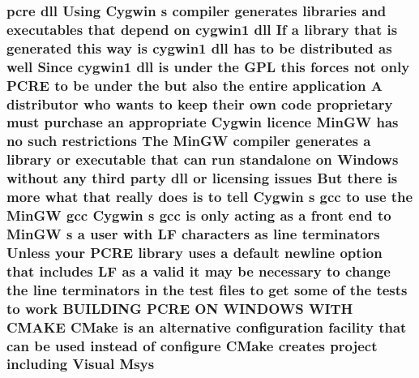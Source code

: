 \subsubsection[{\texorpdfstring{Msys}{Msys}}]{ {\bf pcre} dll Using Cygwin {\bf s} {\bf compiler} generates {\bf libraries} and executables that depend {\bf on} cygwin1 dll If {\bf a} {\bf library} that {\bf is} {\bf generated} {\bf this} {\bf way} {\bf is} cygwin1 dll has {\bf to} {\bf be} {\bf distributed} {\bf as} well Since cygwin1 dll {\bf is} under the {\bf G\+PL} {\bf this} forces {\bf not} only {\bf P\+C\+RE} {\bf to} {\bf be} under the but also the entire application {\bf A} distributor who wants {\bf to} keep their own {\bf code} proprietary must purchase an appropriate Cygwin {\bf licence} {\bf Min\+GW} has no such restrictions The {\bf Min\+GW} {\bf compiler} generates {\bf a} {\bf library} {\bf or} executable that {\bf can} {\bf run} standalone {\bf on} {\bf Windows} without {\bf any} third party dll {\bf or} licensing issues But there {\bf is} more {\bf what} that really does {\bf is} {\bf to} tell Cygwin {\bf s} {\bf gcc} {\bf to} use the {\bf Min\+GW} {\bf gcc} Cygwin {\bf s} {\bf gcc} {\bf is} only acting {\bf as} {\bf a} front {\bf end} {\bf to} {\bf Min\+GW} {\bf s} {\bf a} user {\bf with} {\bf LF} {\bf characters} {\bf as} {\bf line} terminators Unless your {\bf P\+C\+RE} {\bf library} uses {\bf a} {\bf default} {\bf newline} {\bf option} that includes {\bf LF} {\bf as} {\bf a} valid {\bf it} may {\bf be} necessary {\bf to} change the {\bf line} terminators {\bf in} the test {\bf files} {\bf to} get some {\bf of} the {\bf tests} {\bf to} work B\+U\+I\+L\+D\+I\+NG {\bf P\+C\+RE} ON W\+I\+N\+D\+O\+WS W\+I\+TH C\+M\+A\+KE C\+Make {\bf is} an alternative configuration {\bf facility} that {\bf can} {\bf be} {\bf used} instead {\bf of} {\bf configure} C\+Make creates {\bf project} including Visual Msys}\hypertarget{NON-AUTOTOOLS-BUILD_8txt_a4afeca92fc9463569b7d22f76370b65c}{}\label{NON-AUTOTOOLS-BUILD_8txt_a4afeca92fc9463569b7d22f76370b65c}
